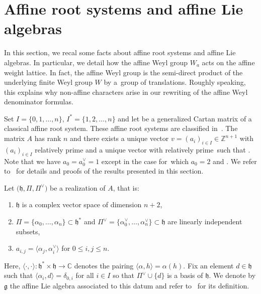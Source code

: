 \documentclass[pdftex]{sigma}
\numberwithin{equation}{section}
\newcommand{\al}{\alpha}
\newcommand{\fh}{\mathfrak{h}}
\newcommand{\fg}{\mathfrak{g}}
\newcommand{\scal}[2]{\langle #1,#2\rangle}
\newcommand{\Z}{\mathbb{Z}}
\begin{document}
\section{Affine root systems and affine Lie algebras}\label{sec:2}


In this section, we recal some facts about affine root systems and affine Lie algebras. In particular, we detail how the affine Weyl group $W_a$ acts on the affine weight lattice. In fact, the affine Weyl group is the semi-direct product of the underlying finite Weyl group $W$ by a~group of translations. Roughly speaking, this explains why non-affine characters arise in our rewriting of the affine Weyl denominator formulas.

Set $I=\{0,1,\dots,n\}$, $I^\ast=\{1,2,\dots,n\}$ and let  be a generalized Cartan matrix of a classical affine root system. These affine root systems
are classified in~\cite[p.~54, Table~1]{KacB}. The
matrix $A$ has rank $n$ and there exists a unique vector $v = (a_i)_{i\in I}\in\mathbb{Z}^{n+1}$ with $(a_i)_{i\in I}$ relatively prime and a unique vector \smash{$v^{\vee} =\bigl(a_i^\vee\bigr)_{i\in I}\in \Z^{n+1}$} with  relatively prime~such that . Note that we have $a_0=a_0^\vee = 1$ except in the  case for~which $a_0=2$ and . We refer to~\cite{carter_affine,KacB} for details and proofs of the results presented in this section.

Let $\bigl(\fh,\Pi,\Pi^\vee\bigr)$ be a realization of $A$, that is:
\begin{enumerate}\itemsep=0pt
\item[(1)] $\fh$ is a complex vector space of dimension $n+2$,
\item[(2)] $\Pi=\{\al_0,\dots,\al_n\}\subset \fh^\ast$ and $\Pi^\vee = \big\{\al_0^\vee,\dots,\al_n^\vee\big\}\subset \fh$ are linearly independent subsets,
\item[(3)] $a_{i,j} = \bigl\langle\al_j,\al^\vee_i\bigr\rangle$ for $0\leq i,j\leq n$.
\end{enumerate}
Here, $\scal{\cdot}{\cdot}\colon \fh^\ast\times \fh\to \mathbb{C}$ denotes the pairing $\scal{\al}{h} = \al(h)$.
Fix an element $d\in \fh$ such that $\scal{\al_i}{d} = \delta_{0,i}$ for all $i\in I$ so that $\Pi^\vee\cup \{d\}$ is a basis of $\fh$.
We denote by $\fg$ the affine Lie algebra associated to this datum and refer to~\cite{KacB} for its definition.
\end{document}
